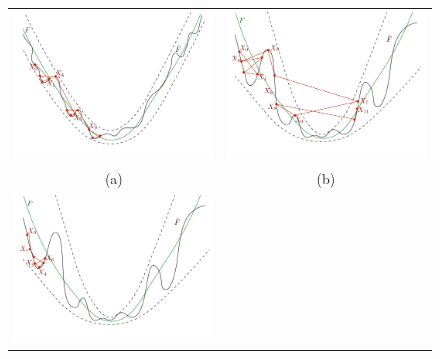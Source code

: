 \documentclass[final,12pt]{colt2018} %
\begin{document}
{\begin{figure}[H]
 \centering
	\begin{tabular}{cc}
		\includegraphics[scale=0.20]{no_annealing}&		\includegraphics[scale=0.20]{hot}\\
		(a)&(b) 	\\ \vspace{.5in}
		\includegraphics[scale=0.20]{cold}&

\end{tabular}
\end{figure}}
\end{document}
